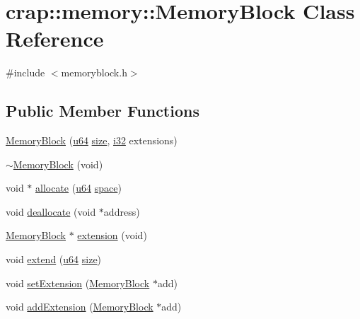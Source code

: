 \hypertarget{classcrap_1_1memory_1_1_memory_block}{\section{crap\-:\-:memory\-:\-:Memory\-Block Class Reference}
\label{classcrap_1_1memory_1_1_memory_block}
}


{\ttfamily \#include $<$memoryblock.\-h$>$}

\subsection*{Public Member Functions}
\begin{DoxyCompactItemize}
\item 
\hyperlink{classcrap_1_1memory_1_1_memory_block_a9c175ed8e94fc18169d7cab70ed9a1c0}{Memory\-Block} (\hyperlink{types_8h_a3f7e2bcbb0b4c338f3c4f6c937cd4234}{u64} \hyperlink{classcrap_1_1memory_1_1_memory_block_af49c6e39cc758374608ddefc66208c24}{size}, \hyperlink{types_8h_a48d6cd8e4135fb2ff7e7f2dac84089ec}{i32} extensions)
\item 
\hyperlink{classcrap_1_1memory_1_1_memory_block_af4a76e8af99c3abe4311e89893fb3c8d}{$\sim$\-Memory\-Block} (void)
\item 
void $\ast$ \hyperlink{classcrap_1_1memory_1_1_memory_block_ae360df41e171a128e01777a642b58c66}{allocate} (\hyperlink{types_8h_a3f7e2bcbb0b4c338f3c4f6c937cd4234}{u64} \hyperlink{classcrap_1_1memory_1_1_memory_block_a195c1960e05e5d3623435626550709fb}{space})
\item 
void \hyperlink{classcrap_1_1memory_1_1_memory_block_a7dfcdcfa9aa6c5bc2a8a9cff8ee710ce}{deallocate} (void $\ast$address)
\item 
\hyperlink{classcrap_1_1memory_1_1_memory_block}{Memory\-Block} $\ast$ \hyperlink{classcrap_1_1memory_1_1_memory_block_a360a9e26428c8aaf1b88692cc69d50a7}{extension} (void)
\item 
void \hyperlink{classcrap_1_1memory_1_1_memory_block_a977152ed513e86e7d9efad4ad58a7ff3}{extend} (\hyperlink{types_8h_a3f7e2bcbb0b4c338f3c4f6c937cd4234}{u64} \hyperlink{classcrap_1_1memory_1_1_memory_block_af49c6e39cc758374608ddefc66208c24}{size})
\item 
void \hyperlink{classcrap_1_1memory_1_1_memory_block_a7303dfc9a452fca121164c9f6f77f75c}{set\-Extension} (\hyperlink{classcrap_1_1memory_1_1_memory_block}{Memory\-Block} $\ast$add)
\item 
void \hyperlink{classcrap_1_1memory_1_1_memory_block_aa4f7bf6d11b2db1baf3d3d97a2a18165}{add\-Extension} (\hyperlink{classcrap_1_1memory_1_1_memory_block}{Memory\-Block} $\ast$add)

\end{DoxyCompactItemize}
